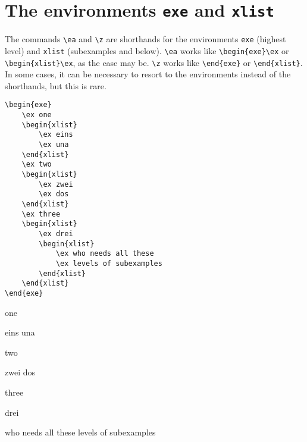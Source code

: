 \documentclass[output=paper]{langscibook}
\newcommand{\cmd}[1]{\texttt{\textbackslash#1}}
\newcommand{\env}[1]{\texttt{#1}}
\begin{document}
\section{The environments \texttt{exe} and \texttt{xlist}}
The commands \cmd{ea} and \cmd{z} are shorthands for the environments \env{exe} (highest level) and \env{xlist} (subexamples and below). \cmd{ea} works like \verb+\begin{exe}\ex+ or \verb+\begin{xlist}\ex+, as the case may be. \cmd{z} works like \verb+\end{exe}+ or \verb+\end{xlist}+. In some cases, it can be necessary to resort to the environments instead of the shorthands, but this is rare. 


\begin{minipage}{.55\textwidth}
\begin{lstlisting}
\begin{exe}
    \ex one
    \begin{xlist}
        \ex eins
        \ex una
    \end{xlist}
    \ex two
    \begin{xlist}
        \ex zwei
        \ex dos
    \end{xlist}    
    \ex three
    \begin{xlist}
        \ex drei        
        \begin{xlist}
            \ex who needs all these
            \ex levels of subexamples
        \end{xlist}
    \end{xlist}
\end{exe}
 \end{lstlisting}
\end{minipage}
\parbox{.45\textwidth}{
\begin{exe}
    \ex one
    \begin{xlist}
        \ex eins
        \ex una
    \end{xlist}
    \ex two
    \begin{xlist}
        \ex zwei
        \ex dos
    \end{xlist}    
    \ex three
    \begin{xlist}
        \ex drei        
        \begin{xlist}
            \ex who needs all these
            \ex levels of subexamples
        \end{xlist}
    \end{xlist}
\end{exe}
}
\end{document}
